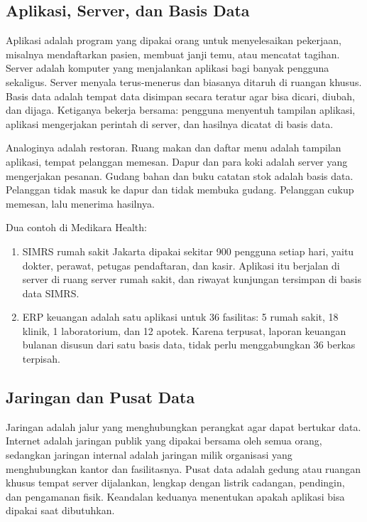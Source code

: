 \subsection{Aplikasi, Server, dan Basis Data}

Aplikasi adalah program yang dipakai orang untuk menyelesaikan pekerjaan, misalnya
mendaftarkan pasien, membuat janji temu, atau mencatat tagihan. Server adalah komputer
yang menjalankan aplikasi bagi banyak pengguna sekaligus. Server menyala terus-menerus
dan biasanya ditaruh di ruangan khusus. Basis data adalah tempat data disimpan secara
teratur agar bisa dicari, diubah, dan dijaga. Ketiganya bekerja bersama: pengguna
menyentuh tampilan aplikasi, aplikasi mengerjakan perintah di server, dan hasilnya
dicatat di basis data.

Analoginya adalah restoran. Ruang makan dan daftar menu adalah tampilan aplikasi, tempat
pelanggan memesan. Dapur dan para koki adalah server yang mengerjakan pesanan. Gudang
bahan dan buku catatan stok adalah basis data. Pelanggan tidak masuk ke dapur dan tidak
membuka gudang. Pelanggan cukup memesan, lalu menerima hasilnya.

Dua contoh di Medikara Health:
\begin{enumerate}
  \item SIMRS rumah sakit Jakarta dipakai sekitar 900 pengguna setiap hari, yaitu
        dokter, perawat, petugas pendaftaran, dan kasir. Aplikasi itu berjalan di server
        di ruang server rumah sakit, dan riwayat kunjungan tersimpan di basis data SIMRS.
  \item ERP keuangan adalah satu aplikasi untuk 36 fasilitas: 5 rumah sakit, 18 klinik,
        1 laboratorium, dan 12 apotek. Karena terpusat, laporan keuangan bulanan disusun
        dari satu basis data, tidak perlu menggabungkan 36 berkas terpisah.
\end{enumerate}

\subsection{Jaringan dan Pusat Data}

Jaringan adalah jalur yang menghubungkan perangkat agar dapat bertukar data. Internet
adalah jaringan publik yang dipakai bersama oleh semua orang, sedangkan jaringan
internal adalah jaringan milik organisasi yang menghubungkan kantor dan fasilitasnya.
Pusat data adalah gedung atau ruangan khusus tempat server dijalankan, lengkap dengan
listrik cadangan, pendingin, dan pengamanan fisik. Keandalan keduanya menentukan apakah
aplikasi bisa dipakai saat dibutuhkan.

